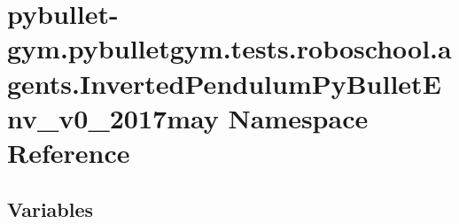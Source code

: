 \hypertarget{namespacepybullet-gym_1_1pybulletgym_1_1tests_1_1roboschool_1_1agents_1_1_inverted_pendulum_py_bullet_env__v0__2017may}{}\section{pybullet-\/gym.pybulletgym.\+tests.\+roboschool.\+agents.\+Inverted\+Pendulum\+Py\+Bullet\+Env\+\_\+v0\+\_\+2017may Namespace Reference}
\label{namespacepybullet-gym_1_1pybulletgym_1_1tests_1_1roboschool_1_1agents_1_1_inverted_pendulum_py_bullet_env__v0__2017may}
\subsection*{Variables}
